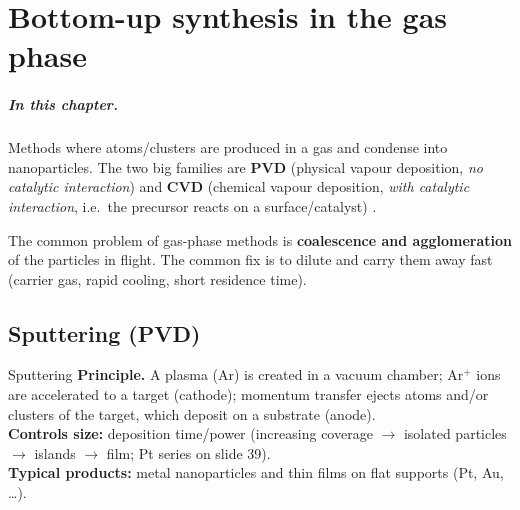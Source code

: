 \chapter{Bottom-up synthesis in the gas phase}
\label{ch:gas}

\paragraph{In this chapter.} Methods where atoms/clusters are produced in a gas and condense into nanoparticles.
The two big families are \textbf{PVD} (physical vapour deposition, \emph{no catalytic interaction}) and
\textbf{CVD} (chemical vapour deposition, \emph{with catalytic interaction}, i.e.\ the precursor reacts on a
surface/catalyst) .

\begin{tipbox}
The common problem of gas-phase methods is \textbf{coalescence and agglomeration} of the particles in flight.
The common fix is to dilute and carry them away fast (carrier gas, rapid cooling, short residence time).
\end{tipbox}

\section{Sputtering (PVD)}
\begin{cardbox}{Sputtering }
\textbf{Principle.} A plasma (Ar) is created in a vacuum chamber; Ar$^+$ ions are accelerated to a target (cathode);
momentum transfer ejects atoms and/or clusters of the target, which deposit on a substrate (anode).\\
\textbf{Controls size:} deposition time/power (increasing coverage $\to$ isolated particles $\to$ islands $\to$ film;
Pt series on slide 39).\\
\textbf{Typical products:} metal nanoparticles and thin films on flat supports (Pt, Au, \ldots).
\end{cardbox}

